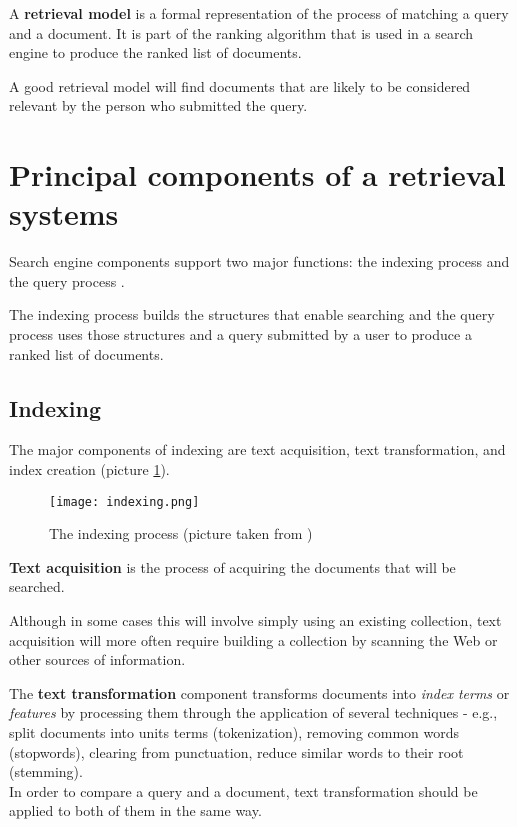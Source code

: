 A \textbf{retrieval model} is a formal representation of the process of matching a query and a document. It is part of the ranking algorithm that is used in a search engine to produce the ranked list of documents.

A good retrieval model will find documents that are likely to be considered relevant by the person who submitted the query.

\section{Principal components of a retrieval systems}
\label{sec:rspc}

Search engine components support two major functions: the indexing process and the query process \cite{croftIR}.

The indexing process builds the structures that enable searching and the query process uses those structures and a query submitted by a user to produce a ranked list of documents. 

\subsection{Indexing}

The major components of indexing are text acquisition, text transformation, and index creation (picture \ref{fig:indexing}).

\begin{figure}
  \centering
  \texttt{[image: indexing.png]}
  \caption{The indexing process (picture taken from \cite{croftIR})}
  \label{fig:indexing}
\end{figure}

\textbf{Text acquisition} is the process of acquiring the documents that will be searched.

Although in some cases this will involve simply using an existing collection, text acquisition will more often require building a collection by scanning the Web or other sources of information.

The \textbf{text transformation} component transforms documents into \textit{index terms} or \textit{features} by processing them through the application of several techniques - e.g., split documents into units terms (tokenization), removing common words (stopwords), clearing from punctuation, reduce similar words to their root (stemming).\\

In order to compare a query and a document, text transformation should be applied to both of them in the same way.

